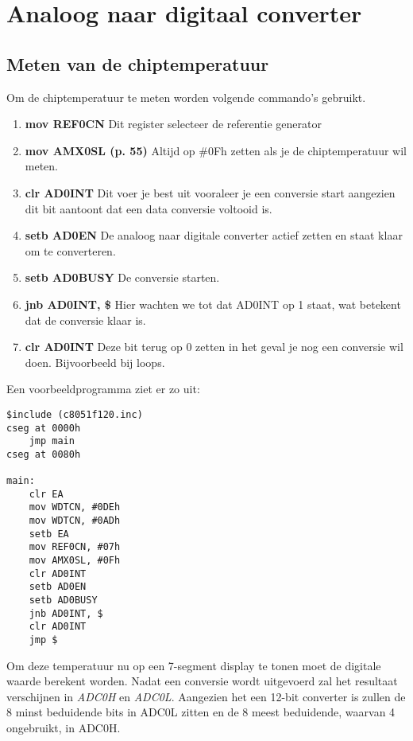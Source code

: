 \documentclass{report}
\begin{document}
\chapter{Analoog naar digitaal converter}
\section{Meten van de chiptemperatuur}
Om de chiptemperatuur te meten worden volgende commando's gebruikt.
\begin{enumerate}
	\item \textbf{mov REF0CN}
	\newline
	Dit register selecteer de referentie generator
	\item \textbf{mov AMX0SL (p. 55)}
	\newline
	Altijd op \#0Fh zetten als je de chiptemperatuur wil meten.
	\item \textbf{clr AD0INT}
	\newline
	Dit voer je best uit vooraleer je een conversie start aangezien dit bit aantoont dat een data conversie voltooid is.
	\item \textbf{setb AD0EN}
	\newline
	De analoog naar digitale converter actief zetten en staat klaar om te converteren.
	\item \textbf{setb AD0BUSY}
	\newline
	De conversie starten.
	\item \textbf{jnb AD0INT, \$}
	\newline
	Hier wachten we tot dat AD0INT op 1 staat, wat betekent dat de conversie klaar is.
	\item \textbf{clr AD0INT}
	\newline
	Deze bit terug op 0 zetten in het geval je nog een conversie wil doen. Bijvoorbeeld bij loops.
\end{enumerate}
Een voorbeeldprogramma ziet er zo uit:
\begin{lstlisting}
$include (c8051f120.inc)
cseg at 0000h
	jmp main
cseg at 0080h

main:
	clr EA
	mov WDTCN, #0DEh
	mov WDTCN, #0ADh
	setb EA
	mov REF0CN, #07h
	mov AMX0SL, #0Fh
	clr AD0INT	
	setb AD0EN
	setb AD0BUSY
	jnb AD0INT, $	
	clr AD0INT	
	jmp $
\end{lstlisting}

Om deze temperatuur nu op een 7-segment display te tonen moet de digitale waarde berekent worden. Nadat een conversie wordt uitgevoerd zal het resultaat verschijnen in \textit{ADC0H} en \textit{ADC0L}. Aangezien het een 12-bit converter is zullen de 8 minst beduidende bits in ADC0L zitten en de 8 meest beduidende, waarvan 4 ongebruikt, in ADC0H.
\end{document}
